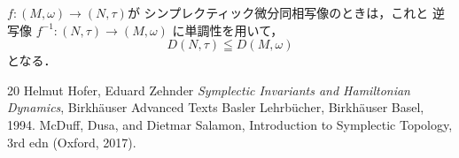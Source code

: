 \(f\colon(M,\omega)\rightarrow (N,\tau)\)が
シンプレクティック微分同相写像のときは，これと
逆写像
\(f^{-1}\colon(N,\tau)\to (M,\omega)\)
に単調性を用いて，
\[
    D(N,\tau)\leqq D(M,\omega)
\]となる．
\begin{thebibliography}{20} 
    Helmut Hofer, Eduard Zehnder
    \textit{Symplectic Invariants and Hamiltonian Dynamics}, 
    Birkh\"auser Advanced Texts Basler Lehrb\"ucher, Birkh\"auser Basel, 1994.
     McDuff, Dusa, 
    and Dietmar Salamon, 
    Introduction to Symplectic Topology, 
    3rd edn (Oxford, 2017).
\end{thebibliography}





